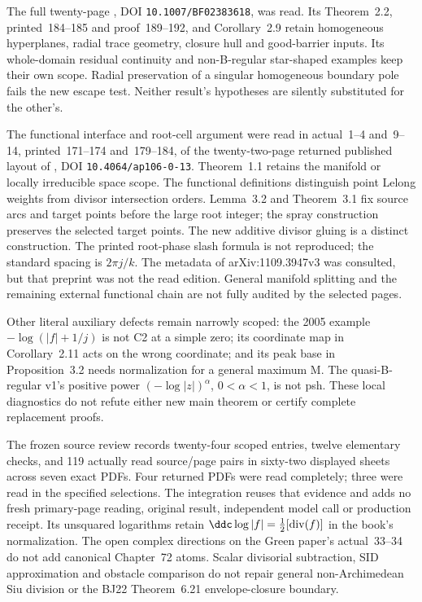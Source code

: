 The full twenty-page \cite{Nguyen05HypersurfaceGreenPublished},
DOI \nolinkurl{10.1007/BF02383618}, was read. Its Theorem~2.2, printed~184--185
and proof~189--192, and Corollary~2.9 retain homogeneous hyperplanes,
radial trace geometry, closure hull and good-barrier inputs. Its
whole-domain residual continuity and non-B-regular star-shaped
examples keep their own scope. Radial preservation of a singular
homogeneous boundary pole fails the new escape test. Neither
result's hypotheses are silently substituted for the other's.

The functional interface and root-cell argument were read in
actual~1--4 and~9--14, printed~171--174 and~179--184, of the
twenty-two-page returned published layout of
\cite{DrinovecForstneric12DiscPublished}, DOI \nolinkurl{10.4064/ap106-0-13}.
Theorem~1.1 retains the manifold or locally irreducible space scope.
The functional definitions distinguish point Lelong weights from
divisor intersection orders. Lemma~3.2 and Theorem~3.1 fix source
arcs and target points before the large root integer; the spray
construction preserves the selected target points. The new
additive divisor gluing is a distinct construction. The printed
root-phase slash formula is not reproduced; the standard spacing
is \(2\pi j/k\). The metadata of arXiv:1109.3947v3 was consulted,
but that preprint was not the read edition. General manifold
splitting and the remaining external functional chain are not
fully audited by the selected pages.

Other literal auxiliary defects remain narrowly scoped: the 2005
example \(-\log(|f|+1/j)\) is not C2 at a simple zero; its
coordinate map in Corollary~2.11 acts on the wrong coordinate;
and its peak base in Proposition~3.2 needs normalization for a
general maximum M. The quasi-B-regular v1's positive power
\((-\log|z|)^\alpha\), \(0<\alpha<1\), is not psh.
These local diagnostics do not refute either new main theorem
or certify complete replacement proofs.

The frozen source review records twenty-four scoped entries,
twelve elementary checks, and 119 actually read source/page pairs
in sixty-two displayed sheets across seven exact PDFs. Four
returned PDFs were read completely; three were read in the
specified selections. The integration reuses that evidence and
adds no fresh primary-page reading, original result, independent
model call or production receipt. Its unsquared logarithms
retain \(\ddc\log|f|=\tfrac12[\operatorname{div}(f)]\) in the
book's normalization. The open complex directions on the Green
paper's actual~33--34 do not add canonical Chapter~72 atoms.
Scalar divisorial subtraction, SID approximation and obstacle
comparison do not repair general non-Archimedean Siu division
or the BJ22 Theorem~6.21 envelope-closure boundary.

